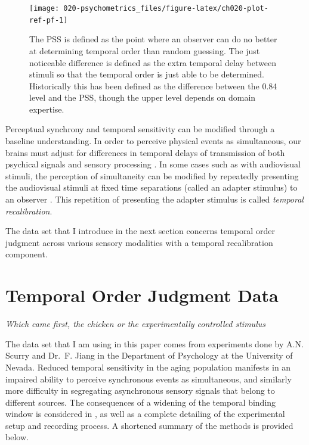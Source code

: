 \documentclass[11pt, oneside, openany]{scrbook}
\begin{document}
\begin{figure}

{\centering \texttt{[image: 020-psychometrics\_files/figure-latex/ch020-plot-ref-pf-1]} 

}

\caption{The PSS is defined as the point where an observer can do no better at determining temporal order than random guessing. The just noticeable difference is defined as the extra temporal delay between stimuli so that the temporal order is just able to be determined. Historically this has been defined as the difference between the 0.84 level and the PSS, though the upper level depends on domain expertise.}\label{fig:ch020-plot-ref-pf}
\end{figure}

Perceptual synchrony and temporal sensitivity can be modified through a baseline understanding. In order to perceive physical events as simultaneous, our brains must adjust for differences in temporal delays of transmission of both psychical signals and sensory processing \citep{fujisaki2004recalibration}. In some cases such as with audiovisual stimuli, the perception of simultaneity can be modified by repeatedly presenting the audiovisual stimuli at fixed time separations (called an adapter stimulus) to an observer \citep{vroomen2004recalibration}. This repetition of presenting the adapter stimulus is called \emph{temporal recalibration}.

The data set that I introduce in the next section concerns temporal order judgment across various sensory modalities with a temporal recalibration component.

\hypertarget{toj-task}{%
\section{Temporal Order Judgment Data}\label{toj-task}}

\emph{Which came first, the chicken or the experimentally controlled stimulus}

The data set that I am using in this paper comes from experiments done by A.N. Scurry and Dr.~F. Jiang in the Department of Psychology at the University of Nevada. Reduced temporal sensitivity in the aging population manifests in an impaired ability to perceive synchronous events as simultaneous, and similarly more difficulty in segregating asynchronous sensory signals that belong to different sources. The consequences of a widening of the temporal binding window is considered in \citet{scurry2019aging}, as well as a complete detailing of the experimental setup and recording process. A shortened summary of the methods is provided below.
\end{document}
